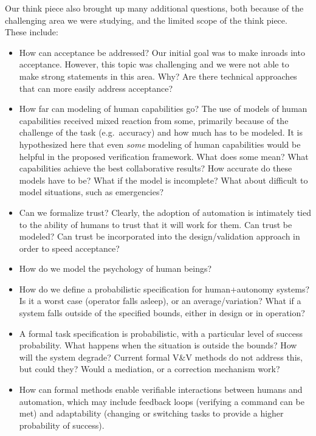 Our think piece also brought up many additional questions, both because of the challenging area we were studying, and the limited scope of the think piece. These include:\vspace*{-0.1 in}
\begin{itemize}
\item How can acceptance be addressed? Our initial goal was to make inroads into acceptance. However, this topic was challenging and we were not able to make strong statements in this area. Why? Are there technical approaches that can more easily address acceptance? \vspace*{-0.1 in}
\item How far can modeling of human capabilities go? The use of models of human capabilities received mixed reaction from some, primarily because of the challenge of the task (e.g.\ accuracy) and how much has to be modeled. It is hypothesized here that even {\it some} modeling of human capabilities would be helpful in the proposed verification framework. What does some mean? What capabilities achieve the best collaborative results? How accurate do these models have to be? What if the model is incomplete? What about difficult to model situations, such as emergencies? \vspace*{-0.1 in}
\item Can we formalize trust? Clearly, the adoption of automation is intimately tied to the ability of humans to trust that it will work for them. Can trust be modeled? Can trust be incorporated into the design/validation approach in order to speed acceptance? \vspace*{-0.1 in}
\item How do we model the psychology of human beings? \vspace*{-0.1 in}
\item How do we define a probabilistic specification for human+autonomy systems? Is it a worst case (operator falls asleep), or an average/variation? What if a system falls outside of the specified bounds, either in design or in operation? \vspace*{-0.1 in}\item A formal task specification is probabilistic, with a particular level of success probability. What happens when the situation is outside the bounds? How will the system degrade? Current formal V\&V methods do not address this, but could they? Would a mediation, or a correction mechanism work?\vspace*{-0.1 in}
\item How can formal methods enable verifiable interactions between humans and automation, which may include feedback loops (verifying a command can be met) and adaptability (changing or switching tasks to provide a higher probability of success). \vspace*{-0.1 in}

\end{itemize}
